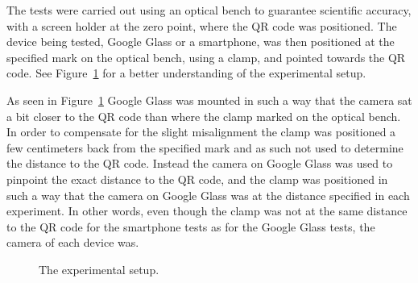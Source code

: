 %
The tests were carried out using an optical bench to guarantee scientific accuracy, with a screen holder at the zero point, where the QR code was positioned. The device being tested, Google Glass or a smartphone, was then positioned at the specified mark on the optical bench, using a clamp, and pointed towards the QR code. See Figure~\ref{experimentalSetup} for a better understanding of the experimental setup. 

As seen in Figure~\ref{experimentalSetup} Google Glass was mounted in such a way that the camera sat a bit closer to the QR code than where the clamp marked on the optical bench. In order to compensate for the slight misalignment the clamp was positioned a few centimeters back from the specified mark and as such not used to determine the distance to the QR code. Instead the camera on Google Glass was used to pinpoint the exact distance to the QR code, and the clamp was positioned in such a way that the camera on Google Glass was at the distance specified in each experiment. In other words, even though the clamp was not at the same distance to the QR code for the smartphone tests as for the Google Glass tests, the camera of each device was.

	\begin{figure}[H]%
		\centering
   		 \qquad
   		 \qquad
		\caption{The experimental setup.}
		\label{experimentalSetup}
	\end{figure}

